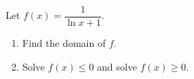 Let $f(x)=\dfrac{1}{\ln x+1}$.
\begin{enumerate}
\item[(a)] Find the domain of $f$.
\item[(b)] Solve $f(x)\le0$ and solve $f(x)\ge0$.
\end{enumerate}
